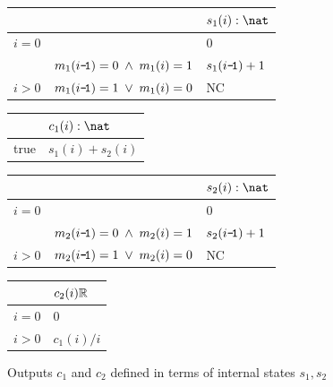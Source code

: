 \begin{figure}[h]
\centering 
\begin{tabular}{ll|l|}
\cline{3-3}
\multicolumn{2}{l}{}                                                                   & \cellcolor[HTML]{EFEFEF}$s_1(i):\nat$ \\ \hline
\multicolumn{2}{|l|}{$i=0$}                                                            & 0                                \\ \hline
\multicolumn{1}{|l|}{}                          & $m_1(i\texttt{-\!1}) = 0 \; \land \; m_1(i) = 1$ & $s_1(i\texttt{-\!1}) + 1$                \\ \cline{2-3} 
\multicolumn{1}{|l|}{\multirow{-2}{*}{$i > 0$}} & $m_1(i\texttt{-\!1}) = 1 \; \lor \; m_1(i) = 0$  & NC                               \\ \hline
\end{tabular}
\quad
\begin{tabular}{l|l|}
\cline{2-2}
                           & $c_1(i):\nat$ \\ \hline
\multicolumn{1}{|l|}{true} & $s_1(i) + s_2(i)$       \\ \hline
\end{tabular}

\bigskip
\begin{tabular}{ll|l|}
\cline{3-3}
\multicolumn{2}{l}{}                                                                   & \cellcolor[HTML]{EFEFEF}$s_2(i):\nat$ \\ \hline
\multicolumn{2}{|l|}{$i=0$}                                                            & 0                                \\ \hline
\multicolumn{1}{|l|}{}                          & $m_2(i\texttt{-\!1}) = 0 \; \land \; m_2(i) = 1$ & $s_2(i\texttt{-\!1}) + 1$                \\ \cline{2-3} 
\multicolumn{1}{|l|}{\multirow{-2}{*}{$i > 0$}} & $m_2(i\texttt{-\!1}) = 1 \; \lor \; m_2(i) = 0$  & NC                               \\ \hline
\end{tabular}
\quad
\begin{tabular}{l|l|}
\cline{2-2}
                            & $c_2(i)\mathbb{R}$   \\ \hline
\multicolumn{1}{|l|}{$i=0$} & 0          \\ \hline
\multicolumn{1}{|l|}{$i>0$} & $c_1(i)/i$ \\ \hline
\end{tabular}

\caption{Outputs $c_1$ and $c_2$ defined in terms of internal states $s_1, s_2$}
\label{tbl:state} 
\end{figure}

